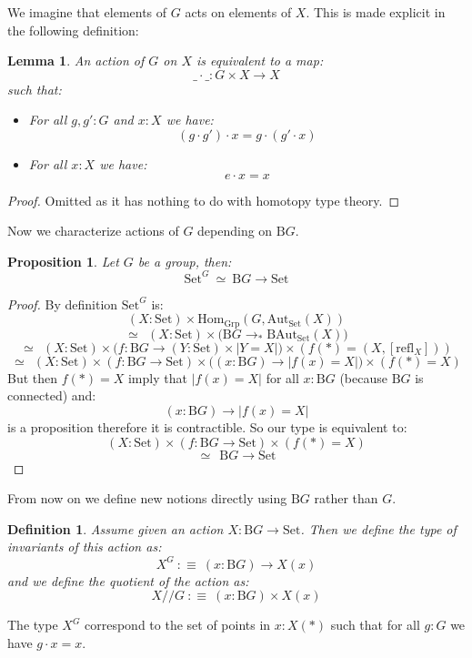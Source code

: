 \documentclass{article}
\renewcommand{\r}{\rightarrow}
\newcommand{\refl}{\mathrm{refl}}
\newcommand{\Grp}{\mathrm{Grp}}
\newcommand{\Hom}{\mathrm{Hom}}
\newcommand{\B}{\mathrm{B}}
\newcommand{\Aut}{\mathrm{Aut}}
\newcommand{\Set}{\mathrm{Set}}
\newtheorem{lemma}{Lemma}
\newtheorem{definition}{Definition}
\newtheorem{proposition}{Proposition}
\begin{document}
We imagine that elements of $G$ acts on elements of $X$. This is made explicit in the following definition:

\begin{lemma}
An action of $G$ on $X$ is equivalent to a map:
\[\_\cdot\_ : G\times X \r X\]
such that:
\begin{itemize}
\item For all $g,g':G$ and $x:X$ we have:
\[(g\cdot g')\cdot x = g\cdot (g'\cdot x)\]
\item For all $x:X$ we have:
\[e\cdot x = x\]
\end{itemize} 
\end{lemma}
\begin{proof}
Omitted as it has nothing to do with homotopy type theory.
\end{proof}

Now we characterize actions of $G$ depending on $\B G$.

\begin{proposition}
Let $G$ be a group, then:
\[\Set^G \ \simeq \ \B G\r \Set\]
\end{proposition}
\begin{proof}
By definition $\Set^G$ is:
\[(X:\Set)\times \Hom_\Grp(G,\Aut_\Set(X))\]
\[\simeq \ \ (X:\Set)\times \big(\B G \r_*\B\Aut_\Set(X)\big)\]
\[\simeq \ \ (X:\Set)\times \big(f : \B G \r (Y:\Set)\times |Y=X|\big) \times (f(*) = (X,[\refl_X]))\]
\[\simeq \ \ (X:\Set)\times (f : \B G \r \Set)\times \big((x:\B G) \r |f(x) = X|\big) \times (f(*) = X)\]
But then $f(*) = X$ imply that $|f(x) = X|$ for all $x:\B G$ (because $\B G$ is connected) and:
\[(x:\B G) \r |f(x) = X|\]
 is a proposition therefore it is contractible. So our type is equivalent to:
\[(X:\Set)\times (f : \B G \r \Set)\times (f(*) = X)\]
\[\simeq \ \ \B G\r \Set\]
\end{proof}

From now on we define new notions directly using $\B G$ rather than $G$.

\begin{definition}
Assume given an action $X:\B G\r \Set$. Then we define the type of invariants of this action as:
\[X^G \ :\equiv \ (x:\B G)\r X(x)\]
and we define the quotient of the action as:
\[X//G \ :\equiv\ (x:\B G)\times X(x)\]
\end{definition}

The type $X^G$ correspond to the set of points in $x:X(*)$ such that for all $g:G$ we have $g\cdot x = x$.%
\end{document}
